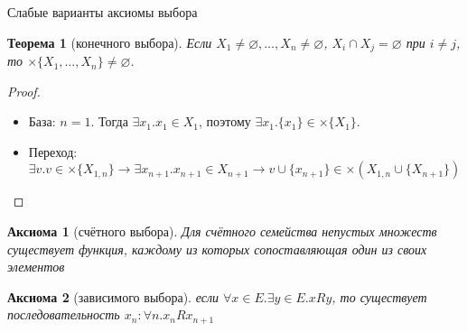 \documentclass[aspectratio=169]{beamer}
\newtheorem{axm}{Аксиома}[section]
\newtheorem{thm}{Теорема}[section]
\begin{document}
\begin{frame}{Слабые варианты аксиомы выбора}

\begin{thm}[конечного выбора]
Если $X_1\ne\varnothing, \dots, X_n\ne\varnothing$, $X_i\cap X_j = \varnothing$ при $i \ne j$, то $\times \{X_1, \dots, X_n\} \ne \varnothing$.
\end{thm}

\begin{proof}
\begin{itemize}\item База: $n=1$. Тогда $\exists x_1.x_1 \in X_1$, поэтому $\exists x_1.\{x_1\} \in \times \{X_1\}$.

\item Переход: %
$\exists v.v \in \times \{X_{1,n}\}\rightarrow\exists x_{n+1}.x_{n+1} \in X_{n+1}\rightarrow
v \cup \{x_{n+1}\} \in \times (X_{1,n}\cup\{X_{n+1}\})$
\end{itemize}\vspace{-0.3cm}\end{proof}




\begin{axm}[счётного выбора]
Для счётного семейства непустых множеств существует функция, каждому из которых сопоставляющая один из своих элементов
\end{axm}

\begin{axm}[зависимого выбора]
если $\forall x \in E.\exists y \in E. x R y$, то существует последовательность $x_n: \forall n.x_n R x_{n+1}$
\end{axm}
\end{frame}
\end{document}
